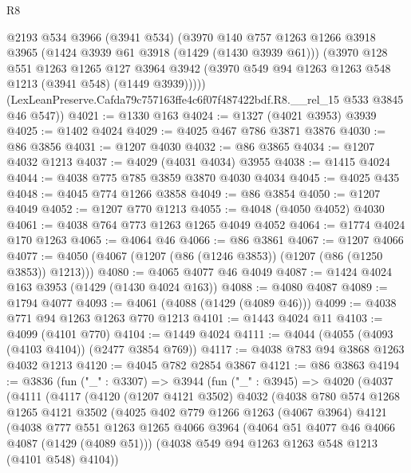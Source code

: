 \begin{lexlean}{R8}
\begin{coremodule}
        @2193
        @534
        @3966
        (@3941 @534)
        (@3970
          @140
          @757
          @1263
          @1266
          @3918
          @3965
          (@1424 @3939 @61 @3918 (@1429 (@1430 @3939 @61)))
          (@3970
            @128
            @551
            @1263
            @1265
            @127
            @3964
            @3942
            (@3970 @549 @94 @1263 @1263 @548 @1213 (@3941 @548) (@1449 @3939)))))
      (LexLeanPreserve.Cafda79c757163ffe4c6f07f487422bdf.R8.__rel_15 @533 @3845 @46 @547))
@4021 := @1330 @163
@4024 := @1327 (@4021 @3953) @3939
@4025 := @1402 @4024
@4029 := @4025 @467 @786 @3871 @3876
@4030 := @86 @3856
@4031 := @1207 @4030
@4032 := @86 @3865
@4034 := @1207 @4032 @1213
@4037 := @4029 (@4031 @4034) @3955
@4038 := @1415 @4024
@4044 := @4038 @775 @785 @3859 @3870 @4030 @4034
@4045 := @4025 @435
@4048 := @4045 @774 @1266 @3858
@4049 := @86 @3854
@4050 := @1207 @4049
@4052 := @1207 @770 @1213
@4055 := @4048 (@4050 @4052) @4030
@4061 := @4038 @764 @773 @1263 @1265 @4049 @4052
@4064 := @1774 @4024 @170 @1263
@4065 := @4064 @46
@4066 := @86 @3861
@4067 := @1207 @4066
@4077 := @4050 (@4067 (@1207 (@86 (@1246 @3853)) (@1207 (@86 (@1250 @3853)) @1213)))
@4080 := @4065 @4077 @46 @4049
@4087 := @1424 @4024 @163 @3953 (@1429 (@1430 @4024 @163))
@4088 := @4080 @4087
@4089 := @1794 @4077
@4093 := @4061 (@4088 (@1429 (@4089 @46)))
@4099 := @4038 @771 @94 @1263 @1263 @770 @1213
@4101 := @1443 @4024 @11
@4103 := @4099 (@4101 @770)
@4104 := @1449 @4024
@4111 := @4044 (@4055 (@4093 (@4103 @4104)) (@2477 @3854 @769))
@4117 := @4038 @783 @94 @3868 @1263 @4032 @1213
@4120 := @4045 @782 @2854 @3867
@4121 := @86 @3863
@4194 := @3836
    (fun ("_" : @3307) =>
    @3944
      (fun ("_" : @3945) =>
      @4020
        (@4037
          (@4111
            (@4117
              (@4120
                (@1207 @4121 @3502)
                @4032
                (@4038
                  @780
                  @574
                  @1268
                  @1265
                  @4121
                  @3502
                  (@4025
                    @402
                    @779
                    @1266
                    @1263
                    (@4067 @3964)
                    @4121
                    (@4038
                      @777
                      @551
                      @1263
                      @1265
                      @4066
                      @3964
                      (@4064 @51 @4077 @46 @4066 @4087 (@1429 (@4089 @51)))
                      (@4038 @549 @94 @1263 @1263 @548 @1213 (@4101 @548) @4104))

\end{coremodule}
\end{lexlean}
